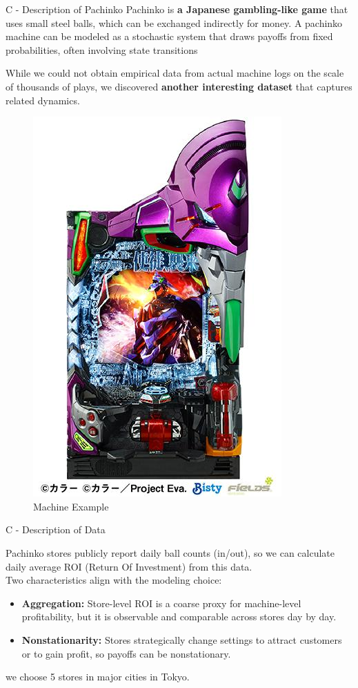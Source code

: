 \documentclass{beamer}
\begin{document}
\begin{frame}{C - Description of Pachinko}
Pachinko is \textbf{a Japanese gambling-like game} that uses small steel balls, which can be exchanged indirectly for money. A pachinko machine can be modeled as a stochastic system that draws payoffs from fixed probabilities, often involving state transitions
\vspace{1em}

While we could not obtain empirical data from actual machine logs on the scale of thousands of plays, we discovered \textbf{another interesting dataset} that captures related dynamics.
\begin{figure}
    \centering
    \includegraphics[width=0.15\linewidth]{../figures/machine_evangelion.jpg}
    \caption{Machine Example}
    \label{fig:placeholder}
\end{figure}
\end{frame}

\begin{frame}{C - Description of Data}

Pachinko stores publicly report daily ball counts (in/out), so we can calculate daily average ROI (Return Of Investment) from this data.\\
\vspace{1em}
Two characteristics align with the modeling choice:
\begin{itemize}
  \item \textbf{Aggregation:} Store-level ROI is a coarse proxy for machine-level profitability, but it is observable and comparable across stores day by day.
  \item \textbf{Nonstationarity:} Stores strategically change settings to attract customers or to gain profit, so payoffs can be nonstationary.
\end{itemize}
we choose 5 stores in major cities in Tokyo.
\end{frame}
\end{document}
